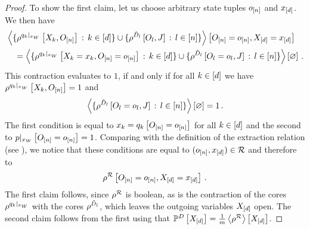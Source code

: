 \begin{proof}
    To show the first claim, let us choose arbitrary state tuples $o_{[n]}$ and $x_{[d]}$.
    We then have
    \begin{align*}
        &\left\langle 
            \{\rho^{{q_{k}}|_{x_{W}}}\left[X_{k},O_{[n]}\right] \, : \, k\in[d]\}
            \cup \{\rho^{\tilde{D}_{l}}\left[O_{l},J\right] \, : \, l\in[n]\}
        \right\rangle \left[ O_{[n]}=o_{[n]},X_{[d]}=x_{[d]} \right] \\
        & \quad  =  \left\langle 
            \{\rho^{{q_{k}}|_{x_{W}}}\left[X_{k}=x_{k},O_{[n]}=o_{[n]}\right] \, : \, k\in[d]\}
            \cup \{\rho^{\tilde{D}_{l}}\left[O_{l}=o_{l},J\right] \, : \, l\in[n]\}
        \right\rangle \left[ \varnothing \right] \, .
    \end{align*}
    This contraction evaluates to $1$, if and only if for all $k\in[d]$ we have $\rho^{{q_{k}}|_{x_{W}}}\left[X_{k},O_{[n]}\right]=1$ and
    \begin{align*}
        \left\langle \{\rho^{\tilde{D}_{l}}\left[O_{l}=o_{l},J\right] \, : \, l\in[n]\}\right\rangle \left[ \varnothing \right]  = 1 \, .
    \end{align*}
    The first condition is equal to $x_{k} = q_{k}\left[O_{[n]}=o_{[n]}\right]$ for all $k\in[d]$ and the second to ${p}|_{x_{W}} \left[O_{[n]}=o_{[n]}\right] = 1$.
    Comparing with the definition of the extraction relation (see ), we notice that these conditions are equal to $(o_{[n]},x_{[d]})\in\mathcal{R}$ and therefore to
    \begin{align*}
        \rho^{\mathcal{R}}\left[O_{[n]}=o_{[n]},X_{[d]}=x_{[d]}\right] \, .
    \end{align*}
    The first claim follows, since $\rho^{\mathcal{R}}$ is boolean, as is the contraction of the cores $\rho^{{q_{k}}|_{x_{W}}}$ with the cores $\rho^{\tilde{D}_{l}}$, which leaves the outgoing variables $X_{[d]}$ open.
    The second claim follows from the first using that $\mathbb{P}^{D}\left[X_{[d]}\right]=\frac{1}{m}\left\langle \rho^{\mathcal{R}}\right\rangle \left[ X_{[d]} \right]$.
\end{proof}

